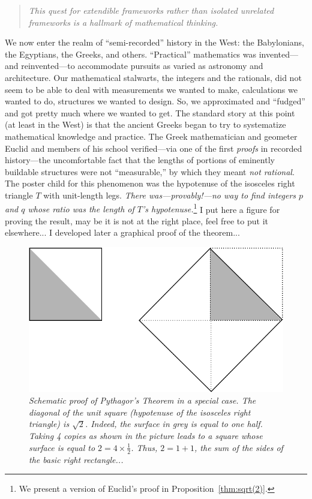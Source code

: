 \begin{quote}
{\em This quest for {\em extendible} frameworks rather than isolated
  unrelated frameworks is a hallmark of mathematical thinking.}
\end{quote}
We now enter the realm of ``semi-recorded'' history in the West: the
Babylonians, the Egyptians, the Greeks, and others.  ``Practical''
mathematics was invented---and reinvented---to accommodate pursuits as
varied as astronomy and architecture.  Our mathematical stalwarts, the
integers and the rationals, did not seem to be able to deal with
measurements we wanted to make, calculations we wanted to do,
structures we wanted to design.  So, we approximated and ``fudged''
and got pretty much where we wanted to get.  The standard story at this
point (at least in the West) is that the ancient Greeks began to try
to systematize mathematical knowledge and practice.  The Greek
mathematician and geometer Euclid
%
and members of his school verified---via one of the first {\em proofs}
in recorded history---the uncomfortable fact that the lengths of
portions of eminently buildable structures were not ``measurable,'' by
which they meant {\em not rational}.  The poster child for this
phenomenon was the hypotenuse of the isosceles right triangle $T$ with
unit-length legs.  {\em There was---provably!---no way to find
  integers $p$ and $q$ whose ratio was the length of $T$'s
  hypotenuse.}\footnote{We present a version of Euclid's proof in
  Proposition~\ref{thm:sqrt(2)}.}
{\Denis I put here a figure for proving the result, may be it is not at the right place, feel free to put it elsewhere...
I developed later a graphical proof of the theorem...}
\begin{figure}[htb]
\begin{center}
       \includegraphics[scale=0.35]{FiguresArithmetic/UnitSquareSQRT2}
\caption{{\it Schematic proof of Pythagor's Theorem in a special case.
The diagonal of the unit square (hypotenuse of the isosceles right triangle) is $\sqrt{2}$.
Indeed, the surface in grey is equal to one half. Taking 4 copies as shown in the picture leads to a square whose surface is equal to $2=4 \times \frac{1}{2}$.
Thus, $2 = 1 + 1$, the sum of the sides of the basic right rectangle...}
\label{fig:unitsquare}}
\end{center}
\end{figure}

